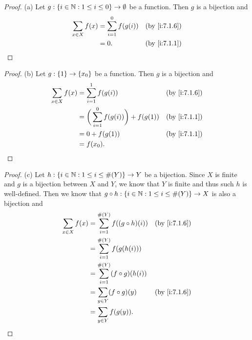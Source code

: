 \begin{proof}{(a)}
  Let \(g : \left\lbrace i \in \mathbb{N} : 1 \leq i \leq 0\right\rbrace \to \emptyset\) be a function.
  Then \(g\) is a bijection and
  \begin{align*}
    \sum_{x \in X} f(x) & = \sum_{i = 1}^0 f(g(i)) &  & \by{i:7.1.6} \\
                        & = 0.                     &  & \by{i:7.1.1}
  \end{align*}
\end{proof}

\begin{proof}{(b)}
  Let \(g : \left\lbrace1\right\rbrace \to \left\lbrace x_0\right\rbrace\) be a function.
  Then \(g\) is a bijection and
  \begin{align*}
    \sum_{x \in X} f(x) & = \sum_{i = 1}^1 f(g(i))                       &  & \by{i:7.1.6} \\
                        & = \bigg(\sum_{i = 1}^0 f(g(i))\bigg) + f(g(1)) &  & \by{i:7.1.1} \\
                        & = 0 + f(g(1))                                  &  & \by{i:7.1.1} \\
                        & = f(x_0).
  \end{align*}
\end{proof}

\begin{proof}{(c)}
  Let \(h : \left\lbrace i \in \mathbb{N} : 1 \leq i \leq \#(Y)\right\rbrace \to Y\) be a bijection.
  Since \(X\) is finite and \(g\) is a bijection between \(X\) and \(Y\), we know that \(Y\) is finite and thus such \(h\) is well-defined.
  Then we know that \(g \circ h : \left\lbrace i \in \mathbb{N} : 1 \leq i \leq \#(Y)\right\rbrace \to X\) is also a bijection and
  \begin{align*}
    \sum_{x \in X} f(x) & = \sum_{i = 1}^{\#(Y)} f((g \circ h)(i)) &  & \by{i:7.1.6} \\
                        & = \sum_{i = 1}^{\#(Y)} f(g(h(i)))                          \\
                        & = \sum_{i = 1}^{\#(Y)} (f \circ g)(h(i))                   \\
                        & = \sum_{y \in Y} (f \circ g)(y)          &  & \by{i:7.1.6} \\
                        & = \sum_{y \in Y} f(g(y)).
  \end{align*}
\end{proof}

